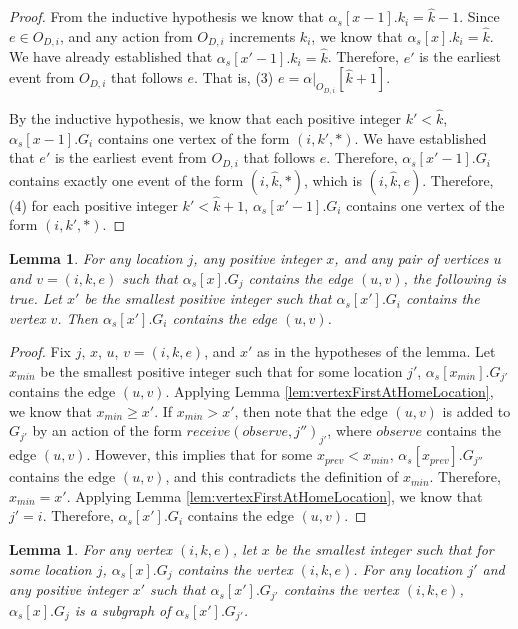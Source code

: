 \documentclass[11pt]{article}
\numberwithin{theorem}{section}
\newtheorem{lemma}[theorem]{Lemma}
\begin{document}
\begin{proof}
From the inductive hypothesis we know that $\alpha_s[x-1].k_i = \hat{k}-1$. Since $e \in O_{D,i}$, and any action from $O_{D,i}$ increments $k_i$, we know that $\alpha_s[x].k_i = \hat{k}$. We have already established that $\alpha_s[x'-1].k_i = \hat{k}$. Therefore, $e'$ is the earliest event from $O_{D,i}$ that follows $e$. That is, (3) $e = \alpha|_{O_{D,i}}[\hat{k}+1]$.

By the inductive hypothesis, we know that each positive integer $k' < \hat{k}$, $\alpha_s[x-1].G_i$ contains one vertex of the form $(i,k',*)$. We have established that $e'$ is the earliest event from $O_{D,i}$ that follows $e$. Therefore, $\alpha_s[x'-1].G_i$ contains exactly one event of the form $(i,\hat{k},*)$, which is $(i,\hat{k},e)$. Therefore, (4) for each positive integer $k' < \hat{k}+1$, $\alpha_s[x'-1].G_i$ contains one vertex of the form $(i,k',*)$.
\end{proof}
 

 
 




\begin{lemma}\label{lem:edgeFirstAtHomeLocation}
For any location $j$, any positive integer $x$, and any pair of
vertices $u$ and $v = (i,k,e)$ such that $\alpha_s[x].G_j$ contains
the edge $(u,v)$, the following is true. Let $x'$ be the smallest
positive integer such that $\alpha_s[x'].G_i$ contains the vertex
$v$. 
Then $\alpha_s[x'].G_i$ contains the edge $(u,v)$.
\end{lemma}



\begin{proof}
Fix $j$, $x$, $u$, $v = (i,k,e)$, and $x'$ as in the hypotheses of the
lemma. Let $x_{min}$ be the smallest positive integer such that for
some location $j'$, $\alpha_s[x_{min}].G_{j'}$ contains the edge
$(u,v)$. Applying Lemma \ref{lem:vertexFirstAtHomeLocation}, 
we know that $x_{min} \geq x'$. If $x_{min} > x'$, then note that the edge
$(u,v)$ is added to $G_{j'}$ by an action of the form
$receive(observe,j'')_{j'}$, where $observe$ contains the edge
$(u,v)$. However, this implies that for some $x_{prev} < x_{min}$,
$\alpha_s[x_{prev}].G_{j''}$ contains the edge $(u,v)$, and this
contradicts the definition of $x_{min}$. Therefore, $x_{min} =
x'$. Applying Lemma \ref{lem:vertexFirstAtHomeLocation}, 
we know that
$j'=i$. Therefore, $\alpha_s[x'].G_i$ contains the edge $(u,v)$.
\end{proof}


\begin{lemma}\label{lem:containsVertexContainsSubgraph}
For any vertex $(i,k,e)$, let $x$ be the smallest integer such that
for some location $j$, $\alpha_s[x].G_j$ contains the vertex
$(i,k,e)$. For any location $j'$ and any positive integer $x'$ such
that $\alpha_s[x'].G_{j'}$ contains the vertex $(i,k,e)$,
$\alpha_s[x].G_j$ is a subgraph of $\alpha_s[x'].G_{j'}$.
\end{lemma}
\end{document}
